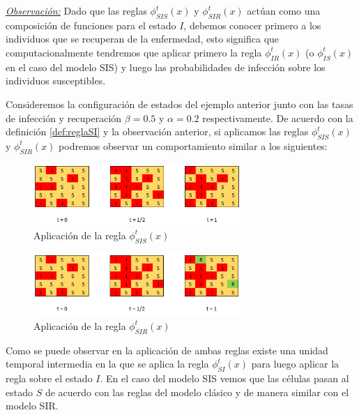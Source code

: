 \underline{\textit{Observación:}} Dado que las reglas $\phi_{SIS}^t(x)$ y $\phi_{SIR}^t(x)$ actúan como una composición de funciones para el estado $I$, debemos conocer primero a los individuos que se recuperan de la enfermedad, esto significa que computacionalmente tendremos que aplicar primero la regla $\phi_{IR}^t(x)$ (o $\phi_{IS}^t(x)$ en el caso del modelo SIS) y luego las probabilidades de infección sobre los individuos susceptibles.



\begin{example}\label{ex:SISySIRenAutomatasCelulares}
Consideremos la configuración de estados del ejemplo anterior junto con las tasas de infección y recuperación $\beta=0.5$ y $\alpha=0.2$ respectivamente. De acuerdo con la definición \ref{def:reglaSI} y la observación anterior, si aplicamos las reglas $\phi_{SIS}^t(x)$ y $\phi_{SIR}^t(x)$ podremos observar un comportamiento similar a los siguientes:


\begin{figure}[h]
  \centering
    \includegraphics[width=0.7\textwidth]{Imagenes/sisAplication.PNG}
    \caption{Aplicación de la regla $\phi_{SIS}^t(x)$}
\end{figure}

\begin{figure}[h]
  \centering
    \includegraphics[width=0.7\textwidth]{Imagenes/sirAplication.PNG}
    \caption{Aplicación de la regla $\phi_{SIR}^t(x)$}
\end{figure}

Como se puede observar en la aplicación de ambas reglas existe una unidad temporal intermedia en la que se aplica la regla $\phi_{SI}^t(x)$ para luego aplicar la regla sobre el estado $I$. En el caso del modelo SIS vemos que las células pasan al estado $S$ de acuerdo con las reglas del modelo clásico y de manera similar con el modelo SIR.
\end{example}

